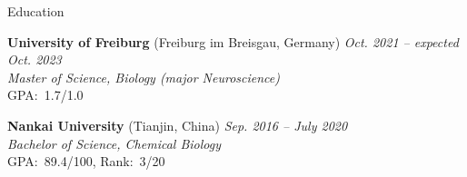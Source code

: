 \begin{rSection}{Education}

    {\bf University of Freiburg} {(Freiburg im Breisgau, Germany)} \hfill {\em Oct. 2021 -- expected Oct. 2023} 
    \\{ \textit {Master of Science, Biology (major Neuroscience)}} 
    \\ { GPA:\ 1.7/1.0}

    {\bf Nankai University} {(Tianjin, China)} \hfill {\em Sep. 2016 -- July 2020} 
    \\ { \textit {Bachelor of Science, Chemical Biology}} \hfill
    \\ { GPA:\ 89.4/100, Rank:\ 3/20} \hfill

\end{rSection}